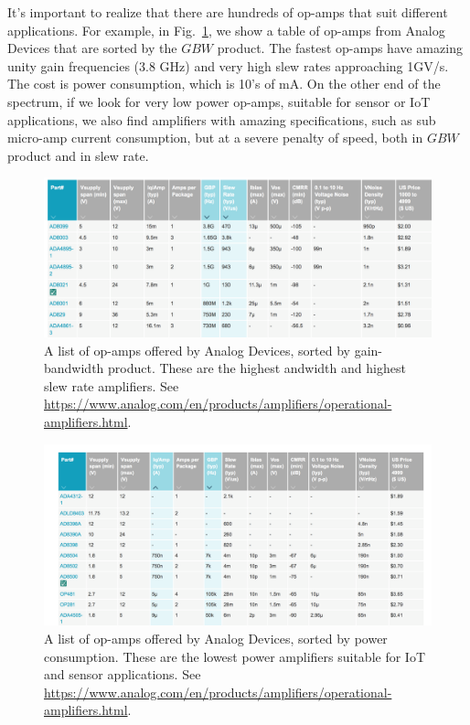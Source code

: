 It's important to realize that there are hundreds of op-amps that suit different applications.  For example, in Fig.~\ref{fig:opamp_table.png}, we show a table of op-amps from Analog Devices that are sorted by the $GBW$ product.  The fastest op-amps have amazing unity gain frequencies (3.8 GHz) and very high slew rates approaching 1GV/s.  The cost is power consumption, which is 10's of mA.  On the other end of the spectrum, if we look for very low power op-amps, suitable for sensor or IoT applications, we also find amplifiers with amazing specifications, such as sub micro-amp current consumption, but at a severe penalty of speed, both in $GBW$ product and in slew rate.  


\begin{figure}[tb]
\begin{center}
\includegraphics[width=\columnwidth]{opamp_table.png}
\end{center}
\caption{A list of op-amps offered by Analog Devices, sorted by gain-bandwidth product.  These are the highest andwidth and highest slew rate amplifiers.  See \url{https://www.analog.com/en/products/amplifiers/operational-amplifiers.html}.} \label{fig:opamp_table.png}
\end{figure}


\begin{figure}[tb]
\begin{center}
\includegraphics[width=\columnwidth]{opamp_lowpower.png}
\end{center}
\caption{A list of op-amps offered by Analog Devices, sorted by power consumption.  These are the lowest power amplifiers suitable for IoT and sensor applications.  See \url{https://www.analog.com/en/products/amplifiers/operational-amplifiers.html}.} \label{fig:opamp_lowpower.png}
\end{figure}







